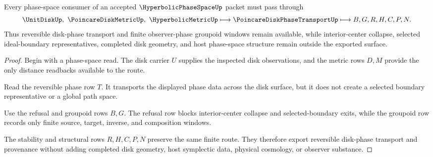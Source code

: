\begin{theorem}
\label{thm:hyperbolic-phase-space-boundary-refusal-stability}
Every phase-space consumer of an accepted $\HyperbolicPhaseSpaceUp$ packet must pass through
$$
\UnitDiskUp,\ \PoincareDiskMetricUp,\ \HyperbolicMetricUp
\longmapsto
\PoincareDiskPhaseTransportUp
\longmapsto
B,G,R,H,C,P,N .
$$
Thus reversible disk-phase transport and finite observer-phase groupoid windows remain available, while interior-center collapse, selected ideal-boundary representatives, completed disk geometry, and host phase-space structure remain outside the exported surface.
\end{theorem}
\begin{proof}
Begin with a phase-space read. The disk carrier $U$ supplies the inspected disk observations, and the metric rows $D,M$ provide the only distance readbacks available to the route.

Read the reversible phase row $T$. It transports the displayed phase data across the disk surface, but it does not create a selected boundary representative or a global path space.

Use the refusal and groupoid rows $B,G$. The refusal row blocks interior-center collapse and selected-boundary exits, while the groupoid row records only finite source, target, inverse, and composition windows.

The stability and structural rows $R,H,C,P,N$ preserve the same finite route. They therefore export reversible disk-phase transport and provenance without adding completed disk geometry, host symplectic data, physical cosmology, or observer substance.
\end{proof}



